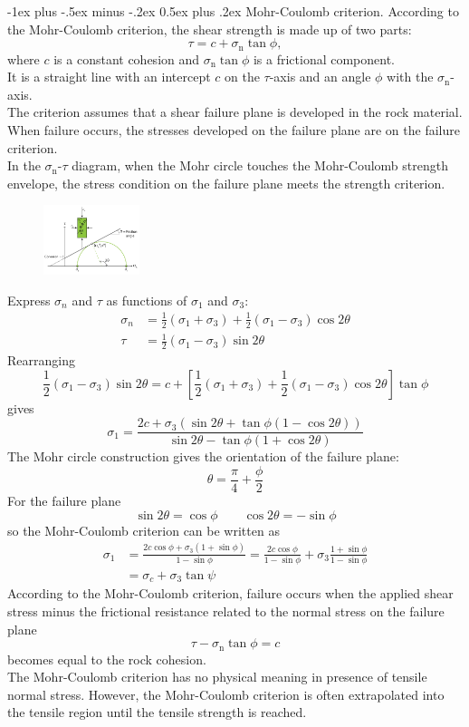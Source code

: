 \documentclass[10pt,landscape,a4paper]{article}
\makeatletter
\renewcommand{\section}{\@startsection{section}{1}{0mm}%
	{-1ex plus -.5ex minus -.2ex}%
	{0.5ex plus .2ex}%
	{\normalfont\large\bfseries}}
\makeatother
\begin{document}
\begin{multicols}{3}
	\section{Mohr-Coulomb criterion.}
	According to the Mohr-Coulomb criterion, the shear strength is made up of two parts:
	\[
		\tau=c+\sigma_\text{n}\tan\phi,
	\]
	where $c$ is a constant cohesion and $\sigma_\text{n}\tan\phi$ is a frictional component.\\
	It is a straight line with an intercept $c$ on the $\tau$-axis and an angle $\phi$ with the $\sigma_\text{n}$-axis.\\
	The criterion assumes that a shear failure plane is developed in the rock material.
	When failure occurs, the stresses developed on the failure plane are on the failure criterion.\\
	In the $\sigma_\text{n}$-$\tau$ diagram, when the Mohr circle touches the Mohr-Coulomb strength envelope, the stress condition on the failure plane meets the strength criterion.
	\begin{figure}[H]
		\centering
		\includegraphics[width=0.25\textwidth]{mohr-coulomb-criterion}
	\end{figure}
	Express $\sigma_n$ and $\tau$ as functions of $\sigma_1$ and $\sigma_3$:
	\begin{align*}
		\sigma_n & =\frac{1}{2}(\sigma_1+\sigma_3)+\frac{1}{2}(\sigma_1-\sigma_3)\cos2\theta \\
		\tau     & =\frac{1}{2}(\sigma_1-\sigma_3)\sin2\theta
	\end{align*}
	Rearranging
	\[
		\frac{1}{2}(\sigma_1-\sigma_3)\sin2\theta=c+\left[\frac{1}{2}(\sigma_1+\sigma_3)+\frac{1}{2}(\sigma_1-\sigma_3)\cos2\theta\right]\tan\phi
	\]
	gives
	\[
		\sigma_1=\frac{2c+\sigma_3(\sin2\theta+\tan\phi(1-\cos2\theta))}{\sin2\theta-\tan\phi(1+\cos2\theta)}
	\]
	The Mohr circle construction gives the orientation of the failure plane:
	\[
		\theta=\frac{\pi}{4}+\frac{\phi}{2}
	\]
	For the failure plane
	\[
		\sin 2\theta=\cos\phi \qquad \cos2\theta=-\sin\phi
	\]
	so the Mohr-Coulomb criterion can be written as
	\begin{align*}
		\sigma_1 & =\frac{2c\cos\phi+\sigma_3(1+\sin\phi)}{1-\sin\phi}=\frac{2c\cos\phi}{1-\sin\phi}+\sigma_3\frac{1+\sin\phi}{1-\sin\phi} \\
		         & =\sigma_c+\sigma_3\tan\psi
	\end{align*}
	According to the Mohr-Coulomb criterion, failure occurs when the applied shear stress minus the frictional resistance related to the normal stress on the failure plane
	\[
		\tau-\sigma_\text{n}\tan\phi=c
	\]
	becomes equal to the rock cohesion.\\
	The Mohr-Coulomb criterion has no physical meaning in presence of tensile normal stress. However, the Mohr-Coulomb criterion is often extrapolated into the tensile region until the tensile strength is reached.
	

\end{multicols}
\end{document}
